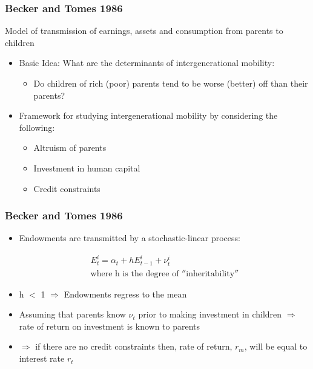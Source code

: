 \documentclass{beamer}
\begin{document}




\begin{frame}
\frametitle{Becker and Tomes 1986}
Model of transmission of earnings, assets and consumption from parents to children 

\begin{itemize}
\item Basic Idea: What are the determinants of intergenerational mobility:
\begin{itemize}
\item Do children of rich (poor) parents tend to be worse (better) off than their parents? 
\end{itemize}

\item Framework for studying intergenerational mobility by considering the following:
\begin{itemize}
\item Altruism of parents 
\item Investment in human capital
\item Credit constraints

\end{itemize}
\end{itemize}
\end{frame}


\begin{frame}
\frametitle{Becker and Tomes 1986}
\begin{itemize}

\item Endowments are transmitted by a stochastic-linear process:

\begin{align*}
E^i_{t} = \alpha_{t} + h E^i_{t-1} + \nu^i_{t}  \\
\text{where h is the degree of $''$inheritability$''$} 
\end{align*}

\item h $<$ 1 $\Rightarrow$  Endowments regress to the mean

\item Assuming that parents know $\nu_{t}$ prior to making investment in children $\Rightarrow$ rate of return on investment is known to parents 

\item $\Rightarrow$ if there are no credit constraints then, rate of return, $r_{m}$, will be equal to interest rate $r_{t}$ 
\end{itemize}
\end{frame}
\end{document}
